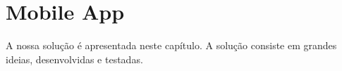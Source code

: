 \chapter{Mobile App} \label{cap:mobileApp}

A nossa solução é apresentada neste capítulo. A solução consiste em grandes ideias, desenvolvidas e testadas.
